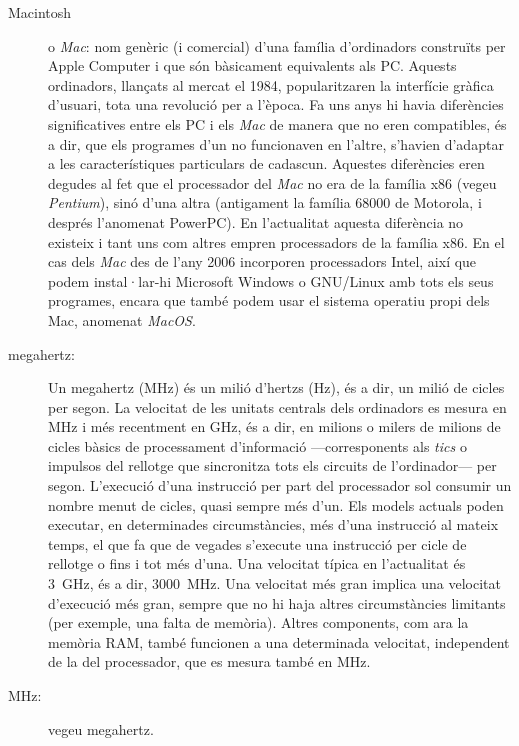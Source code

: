 \begin{description}
\item[Macintosh] o \emph{Mac}: nom genèric (i comercial) d'una família
  d'ordinadors construïts per Apple Computer i que són bàsicament
  equivalents als PC. Aquests ordinadors, llançats al mercat el 1984,
  popularitzaren la interfície gràfica d'usuari, tota una revolució
  per a l'època. Fa uns anys hi havia diferències significatives entre
  els PC i els \emph{Mac} de manera que no eren compatibles, és a dir,
  que els programes d'un no funcionaven en l'altre, s'havien d'adaptar
  a les característiques particulars de cadascun. Aquestes diferències
  eren degudes al fet que el processador del \emph{Mac} no era de la
  família x86 (vegeu \emph{Pentium}), sinó d'una altra (antigament la
  família 68000 de Motorola, i després l'anomenat PowerPC). En
  l'actualitat aquesta diferència no existeix i tant uns com altres
  empren processadors de la família x86. En el cas dels \emph{Mac} des
  de l'any 2006 incorporen processadors Intel, així que podem
  instal·lar-hi Microsoft Windows o GNU/Linux amb tots els seus
  programes, encara que també podem usar el sistema operatiu propi
  dels Mac, anomenat \emph{MacOS}.
  
\item[megahertz:] Un megahertz (MHz) és un milió d'hertzs (Hz), és a
  dir, un milió de cicles per segon. La velocitat de les unitats
  centrals dels ordinadors es mesura en MHz i més recentment en GHz,
  és a dir, en milions o milers de milions de cicles bàsics de
  processament d'informació ---corresponents als \emph{tics} o
  impulsos del rellotge que sincronitza tots els circuits de
  l'ordinador--- per segon.  L'execució d'una instrucció per part del
  processador sol consumir un nombre menut de cicles, quasi sempre més
  d'un. Els models actuals poden executar, en determinades
  circumstàncies, més d'una instrucció al mateix temps, el que fa que
  de vegades s'execute una instrucció per cicle de rellotge o fins i
  tot més d'una.  Una velocitat típica en l'actualitat és 3~GHz, és a
  dir, 3000~MHz. Una velocitat més gran implica una velocitat
  d'execució més gran, sempre que no hi haja altres circumstàncies
  limitants (per exemple, una falta de memòria).  Altres components,
  com ara la memòria RAM, també funcionen a una determinada velocitat,
  independent de la del processador, que es mesura també en MHz.

\item[MHz:] vegeu megahertz.
  

\end{description}
